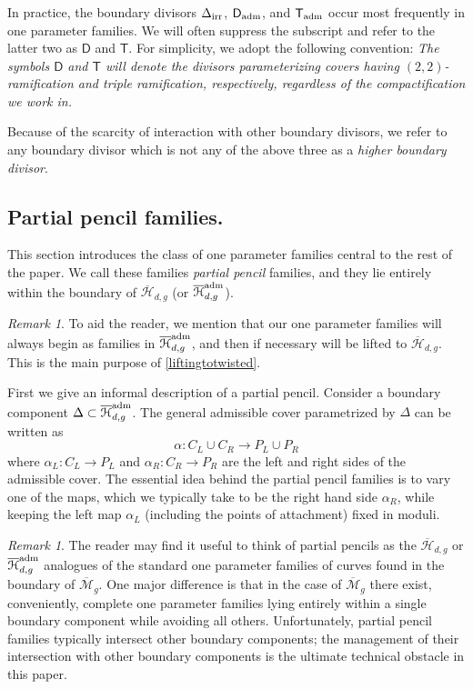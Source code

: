 \documentclass[reqno, 10 pt]{article}
\theoremstyle{definition}
\theoremstyle{remark}
\newtheorem{rmk}[thm]{Remark}
\numberwithin{equation}{section}
\numberwithin{thm}{section}
\numberwithin{prop}{section}
\numberwithin{lem}{section}
\numberwithin{cor}{section}
\numberwithin{conj}{section}
\numberwithin{defn}{section}
\renewcommand{\H}{\mathcal H}
\newcommand{\Hdg}{\overline{\H}_{d,g}}
\renewcommand{\to}{\longrightarrow}
\newcommand{\sfT}{{\mathsf T}}
\newcommand{\sfD}{{\mathsf D}}
\newcommand{\Mg}{{\overline{\mathcal{M}}_{g}}}
\newcommand {\from}{{\colon}}
\renewcommand{\H}{{\mathcal{H}}}
\begin{document}
\subsubsection{}\label{higherboundarydivisor}
  In practice, the boundary divisors $\Delta_{\rm irr}$, $\sfD_{\rm adm}$, and $\sfT_{\rm adm}$  occur most frequently in one parameter families.  We will often suppress the subscript and refer to the latter two as $\sfD$ and $\sfT$.  For simplicity, we adopt the following convention: {\sl The symbols $\sfD$ and $\sfT$ will denote the divisors parameterizing covers having $(2,2)$-ramification and triple ramification, respectively, regardless of the compactification we work in.}

  Because of the scarcity of interaction with other boundary divisors, we refer to any boundary divisor which is not any of the above three as a {\sl higher boundary divisor}.

\subsection{Partial pencil families.} 
  This section introduces the class of one parameter families central to the rest of the paper.  We call these families {\sl partial pencil} families, and they lie entirely within the boundary of $\Hdg$ (or $\Hdg^{\rm{adm}}$).   

  \begin{rmk}
  To aid the reader, we mention that our one parameter families will always begin as families in $\Hdg^{\rm{adm}}$, and then if necessary will be lifted to $\Hdg$. This is the main purpose of \autoref{liftingtotwisted}.
  \end{rmk} 
   
   First we give an informal description of a partial pencil. Consider a boundary component $\Delta \subset \Hdg^{\rm{adm}}$.  The general admissible cover parametrized by $\Delta$ can be written as \[\alpha \from C_{L} \cup C_{R} \to P_{L} \cup P_{R}\] where $\alpha_{L} \from C_{L} \to P_{L}$ and $\alpha_{R} \from C_{R} \to P_{R}$ are the left and right sides of the admissible cover.  The essential idea behind the partial pencil families is to vary one of the maps, which we typically take to be the right hand side $\alpha_{R}$, while keeping the left map $\alpha_{L}$ (including the points of attachment) fixed in moduli.  
   
  \begin{rmk}\label{analogy}
   The reader may find it useful to think of partial pencils as the $\Hdg$ or $\Hdg^{\rm{adm}}$ analogues of the standard one parameter families of curves found in the boundary of $\Mg$.  One major difference is that in the case of $\Mg$ there exist, conveniently, complete one parameter families lying entirely within a single boundary component while avoiding all others.  Unfortunately, partial pencil families typically intersect other boundary components; the management of their intersection with other boundary components is the ultimate technical obstacle in this paper. 
   \end{rmk}
   
\end{document}
